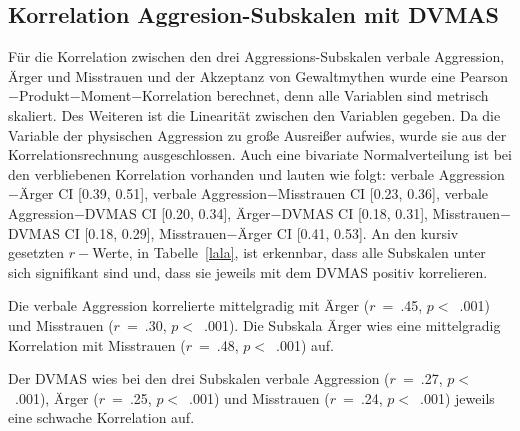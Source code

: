 

\subsection{Korrelation Aggresion-Subskalen mit DVMAS}  \label{subsec_4.4.1}

Für die Korrelation zwischen den drei Aggressions-Subskalen verbale Aggression, Ärger und Misstrauen und der Akzeptanz von Gewaltmythen wurde eine Pearson$-$Produkt$-$Moment$-$Korrelation berechnet, denn alle Variablen sind metrisch skaliert. Des Weiteren ist die Linearität zwischen den Variablen gegeben. Da die Variable der physischen Aggression zu große Ausreißer aufwies, wurde sie aus der Korrelationsrechnung ausgeschlossen. Auch eine bivariate Normalverteilung ist bei den verbliebenen Korrelation vorhanden und lauten wie folgt: verbale Aggression$-$Ärger CI [0.39, 0.51], verbale Aggression$-$Misstrauen CI [0.23, 0.36], verbale Aggression$-$DVMAS CI [0.20, 0.34], Ärger$-$DVMAS CI [0.18, 0.31], Misstrauen$-$DVMAS CI [0.18, 0.29], Misstrauen$-$Ärger CI [0.41, 0.53]. An den kursiv gesetzten $r-$Werte, in Tabelle~\ref{lala}, ist erkennbar, dass alle Subskalen unter sich signifikant sind und, dass sie jeweils mit dem DVMAS positiv korrelieren. 

Die verbale Aggression korrelierte mittelgradig mit Ärger ($r$~=~.45, $p<$~.001) und Misstrauen ($r$~=~.30, $p<$~.001).
Die Subskala Ärger wies eine mittelgradig Korrelation mit Misstrauen ($r$~=~.48, $p<$~.001) auf.

Der DVMAS wies bei den drei Subskalen verbale Aggression ($r$~=~.27, $p<$~.001), Ärger ($r$~=~.25, $p<$~.001) und Misstrauen ($r$~=~.24, $p<$~.001) jeweils eine schwache Korrelation auf.

